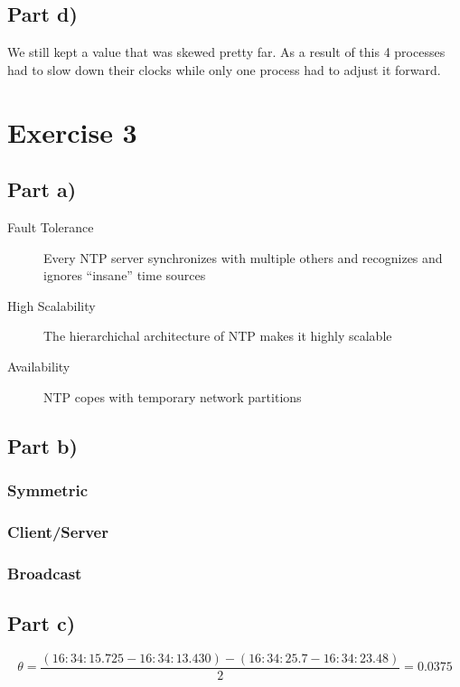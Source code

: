 \documentclass[10pt,a4paper]{article}
\begin{document}
\subsection*{Part d)}

We still kept a value that was skewed pretty far. As a result of this 4
processes had to slow down their clocks while only one process had to adjust it
forward.

\section*{Exercise 3}

\subsection*{Part a)}

\begin{description}
\item[Fault Tolerance] Every NTP server synchronizes with multiple others and
  recognizes and ignores ``insane'' time sources
\item[High Scalability] The hierarchichal architecture of NTP makes it highly
  scalable
\item[Availability] NTP copes with temporary network partitions
\end{description}

\subsection*{Part b)}

\subsubsection*{Symmetric}

\subsubsection*{Client/Server}

\subsubsection*{Broadcast}

\subsection*{Part c)}

\begin{equation*}
  \theta = \frac{(16:34:15.725 - 16:34:13.430) - (16:34:25.7 - 16:34:23.48)}{2} = 0.0375
\end{equation*}
\end{document}
